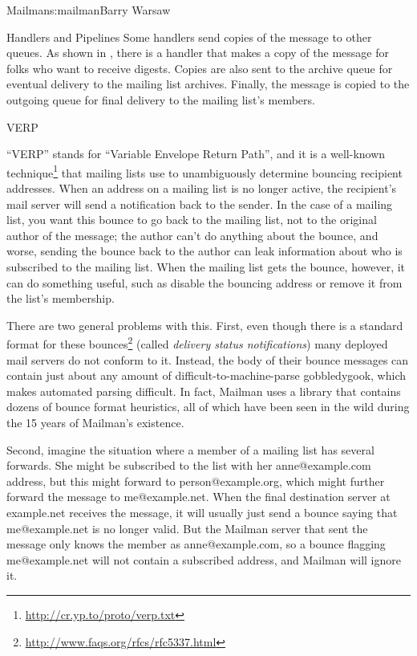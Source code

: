 \begin{aosachapter}{Mailman}{s:mailman}{Barry Warsaw}
\begin{aosasect1}{Handlers and Pipelines}
Some handlers send copies of the message to other queues.  As shown in
, there is a handler that makes a
copy of the message for folks who want to receive digests.  Copies are
also sent to the archive queue for eventual delivery to the mailing
list archives.  Finally, the message is copied to the outgoing queue
for final delivery to the mailing list's members.

\end{aosasect1}

\begin{aosasect1}{VERP}

``VERP'' stands for ``Variable Envelope Return Path'', and it is a
well-known technique\footnote{\url{http://cr.yp.to/proto/verp.txt}}
that mailing lists use to unambiguously determine bouncing
recipient addresses.  When an address on a mailing list is no longer
active, the recipient's mail server will send a notification back to
the sender.  In the case of a mailing list, you want this bounce to go
back to the mailing list, not to the original author of the message;
the author can't do anything about the bounce, and worse, sending the
bounce back to the author can leak information about who is subscribed
to the mailing list.  When the mailing list gets the bounce, however, it can do
something useful, such as disable the bouncing address or remove it
from the list's membership.

There are two general problems with this.  First, even though there is
a standard format for these
bounces\footnote{\url{http://www.faqs.org/rfcs/rfc5337.html}} (called
\emph{delivery status notifications}) many deployed mail servers do
not conform to it.  Instead, the body of their bounce messages can
contain just about any amount of difficult-to-machine-parse
gobbledygook, which makes automated parsing difficult.  In fact,
Mailman uses a library that contains dozens of bounce format
heuristics, all of which have been seen in the wild during the 15
years of Mailman's existence.

Second, imagine the situation where a member of a mailing list has
several forwards.  She might be subscribed to the list with her
anne@example.com address, but this might forward to
person@example.org, which might further forward the message to
me@example.net.  When the final destination server at example.net
receives the message, it will usually just send a bounce saying that
me@example.net is no longer valid.  But the Mailman server that sent
the message only knows the member as anne@example.com, so a bounce
flagging me@example.net will not contain a subscribed address, and
Mailman will ignore it.


\end{aosasect1}
\end{aosachapter}
